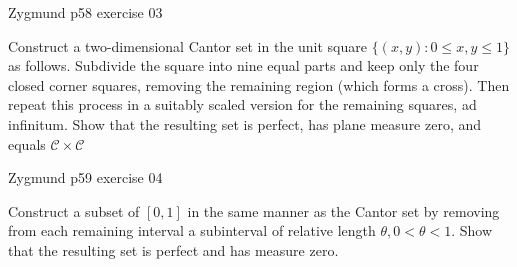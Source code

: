 \documentclass[UTF8,a4paper,10pt]{article}
\begin{document}
  \begin{Problem}[]{Zygmund p58 exercise 03}

    Construct a two-dimensional Cantor set in the unit square $\{(x, y) : 0 \leq x, y \leq 1\}$ as follows. Subdivide the square into nine equal parts and keep only the four closed corner squares, removing the remaining region (which forms a cross). Then repeat this process in a suitably scaled version for the remaining squares, ad infinitum. Show that the resulting set is perfect, has plane measure zero, and equals $\mathcal{C} \times \mathcal{C} $
  
  \end{Problem}
  \pagebreak


  \begin{Problem}[]{Zygmund p59 exercise 04}

    Construct a subset of $[0, 1]$ in the same manner as the Cantor set by
    removing from each remaining interval a subinterval of relative length
    $θ, 0 < θ < 1$. Show that the resulting set is perfect and has measure zero.
  
  \end{Problem}
\end{document}
